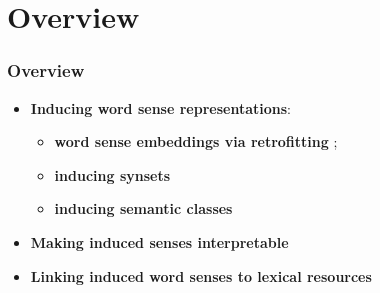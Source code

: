 \section{Overview}

\begin{frame}
  \frametitle{Overview}

  \begin{itemize}
		\item \alert{\textbf{Inducing word sense representations}}:
		\begin{itemize}
		\item \textbf{word sense embeddings via retrofitting} \cite{pelevina-EtAl:2016:RepL4NLP,remus:2018};
		\item \textbf{inducing synsets}~\cite{ustalov-panchenko-biemann:2017:Long,ustalov2017fighting,madoc43362}
		\item \textbf{inducing semantic classes} \cite{panchenko:2018:SemanticClasses} 
				
		\end{itemize}

	
	\pause 
	\vspace{1em}
	\item \alert{\textbf{Making induced senses interpretable}} \cite{panchenko-EtAl:2017:EMNLP2017Demos,panchenko-EtAl:2017:EACLlong}
	
	\pause
	\vspace{1em}
	\item \alert{\textbf{Linking induced word senses to lexical resources}}~\cite{panchenko2016best,faralli2016linked,panchenko-EtAl:2017:SENSE2017,biemann2018framework}	
			
\end{itemize}
	
\end{frame}


